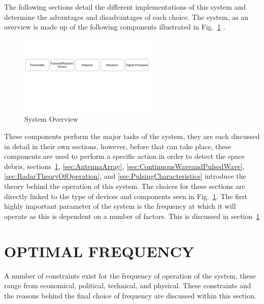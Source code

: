 \documentclass[11pt]{witseiepaper}
\begin{document}
\begin{bibunit}[witseie]
The following sections detail the different implementations of this system and determine the advantages and disadvantages of each choice.
The system, as an overview is made up of the following components illustrated in Fig.~\ref{fig:SystemOverview} \cite{radarHandbook}.

    \begin{figure}
        \centering
        \includegraphics[width=0.6\textwidth]{SystemOverview.pdf}
        \caption{System Overview}
        \label{fig:SystemOverview}    
    \end{figure}

These components perform the major tasks of the system, they are each discussed in detail in their own sections, however, before that can take place, these components are used to perform a specific action in order to detect the space debris, sections~\ref{sec:OptimalFrequency}, \ref{sec:AntennaArray}, \ref{sec:ContinuousWaveandPulsedWave}, \ref{sec:RadarTheoryOfOperation}, and \ref{sec:PulsingCharacteristics} introduce the theory behind the operation of this system. The choices for these sections are directly linked to the type of devices and components seen in Fig.~\ref{fig:SystemOverview}.
The first highly important parameter of the system is the frequency at which it will operate as this is dependent on a number of factors. This is discussed in section~\ref{sec:OptimalFrequency}


\section{OPTIMAL FREQUENCY} \label{sec:OptimalFrequency}
A number of constraints exist for the frequency of operation of the system, these range from economical, political, technical, and physical. These constraints and the reasons behind the final choice of frequency are discussed within this section.


\end{bibunit}
\end{document}
